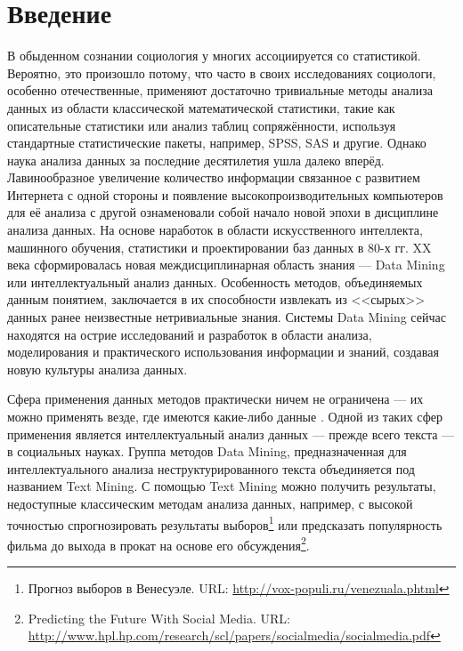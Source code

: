 \chapter*{Введение}							%

В обыденном сознании социология у многих ассоциируется со статистикой. Вероятно, это произошло потому, что часто в своих исследованиях социологи, особенно отечественные, применяют достаточно тривиальные методы анализа данных из области классической математической статистики, такие как описательные статистики или анализ таблиц сопряжённости, используя стандартные статистические пакеты, например, SPSS, SAS и другие. Однако наука анализа данных за последние десятилетия ушла далеко вперёд. Лавинообразное увеличение количество информации связанное с развитием Интернета с одной стороны и появление высокопроизводительных компьютеров для её анализа с другой ознаменовали собой начало новой эпохи в дисциплине анализа данных. На основе наработок в области искусственного интеллекта, машинного обучения, статистики и проектировании баз данных в 80-х гг. XX века сформировалась новая междисциплинарная область знания --- Data Mining или интеллектуальный анализ данных. Особенность методов, объединяемых данным понятием, заключается в их способности извлекать из <<сырых>> данных ранее неизвестные нетривиальные знания. Системы Data Mining сейчас находятся на острие исследований и разработок в области анализа, моделирования и практического использования информации и знаний, создавая новую культуры анализа данных.

Сфера применения данных методов практически ничем не ограничена --- их можно применять везде, где имеются какие-либо данные \cite[стр. 81]{Duk2011}. Одной из таких сфер применения является интеллектуальный анализ данных --- прежде всего текста --- в социальных науках. Группа методов Data Mining, предназначенная для интеллектуального анализа неструктурированного текста объединяется под названием Text Mining. С помощью Text Mining можно получить результаты, недоступные классическим методам анализа данных, например, с высокой точностью спрогнозировать результаты выборов\footnote{Прогноз выборов в Венесуэле. URL: \url{http://vox-populi.ru/venezuala.phtml}} или предсказать популярность фильма до выхода в прокат на основе его обсуждения\footnote{Predicting the Future With Social Media. URL: \url{http://www.hpl.hp.com/research/scl/papers/socialmedia/socialmedia.pdf}}. 

